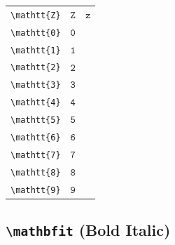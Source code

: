 \documentclass[12pt,a4paper]{article}
\begin{document}
\begin{longtable}{|c|c|c|}
\verb|\mathtt{Z}| & $\mathtt{Z}$ & $\mathtt{z}$ \\ %
\verb|\mathtt{0}| & $\mathtt{0}$ & \\ %
\verb|\mathtt{1}| & $\mathtt{1}$ & \\ %
\verb|\mathtt{2}| & $\mathtt{2}$ & \\ %
\verb|\mathtt{3}| & $\mathtt{3}$ & \\ %
\verb|\mathtt{4}| & $\mathtt{4}$ & \\ %
\verb|\mathtt{5}| & $\mathtt{5}$ & \\ %
\verb|\mathtt{6}| & $\mathtt{6}$ & \\ %
\verb|\mathtt{7}| & $\mathtt{7}$ & \\ %
\verb|\mathtt{8}| & $\mathtt{8}$ & \\ %
\verb|\mathtt{9}| & $\mathtt{9}$ & \\ %
\hline
\end{longtable}

\newpage

\subsection*{\texttt{\textbackslash{}mathbfit} (Bold Italic)}
\end{document}
